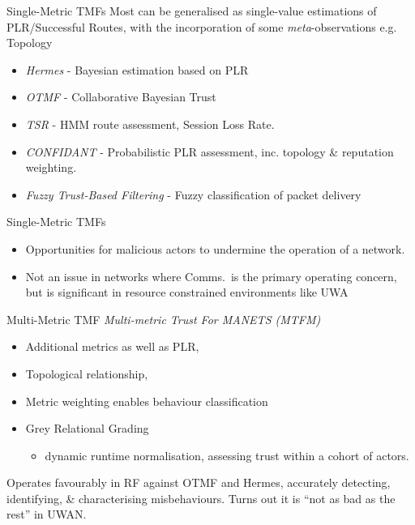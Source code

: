 \documentclass[aspectratio=169]{beamer}
\begin{document}
\begin{frame}{Single-Metric TMFs}
  Most can be generalised as single-value estimations of PLR/Successful Routes, with the incorporation of some \emph{meta}-observations e.g. Topology
  \begin{itemize}
    \item \emph{Hermes} \autocite{Zouridaki2005} - Bayesian estimation based on PLR
    \item \emph{OTMF} \autocite{Li2008} - Collaborative Bayesian Trust
    \item \emph{TSR} \autocite{Moe2008a} - HMM route assessment, Session Loss Rate.
    \item \emph{CONFIDANT} \autocite{Buchegger2002} - Probabilistic PLR assessment, inc. topology \& reputation weighting.
    \item \emph{Fuzzy Trust-Based Filtering} \autocite{Luo2008} - Fuzzy classification of packet delivery
  \end{itemize}
\end{frame}
\begin{frame}{Single-Metric TMFs}
  \begin{itemize}
    \item
      Opportunities for malicious actors to undermine the operation of a network. 
    \item 
      Not an issue in networks where Comms.\ is the primary operating concern, but is significant in resource constrained environments \pause \alert{like UWA}
  \end{itemize}
\end{frame}

\begin{frame}{Multi-Metric TMF} 
  \emph{Multi-metric Trust For MANETS (MTFM)} \autocite{Guo11} 
  \begin{itemize}
    \item Additional metrics as well as PLR, 
    \item Topological relationship,
    \item Metric weighting enables behaviour classification
    \item Grey Relational Grading 
      \begin{itemize}
        \item dynamic runtime normalisation, assessing  trust within a cohort of actors.
      \end{itemize}
  \end{itemize}
  \pause
  \centering
  Operates favourably in RF against OTMF and Hermes, accurately detecting, identifying, \& characterising misbehaviours.\autocite{Guo11}
  \pause
  \centering
  Turns out it is ``not as bad as the rest'' in UWAN.\autocite{Bolster2015}  
\end{frame}
\end{document}
